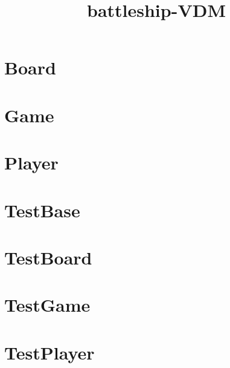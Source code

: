 \documentclass{article}
\begin{document}
\title{battleship-VDM}
\author{}
\maketitle
\tableofcontents

\section{Board}

\section{Game}

\section{Player}

\section{TestBase}

\section{TestBoard}

\section{TestGame}

\section{TestPlayer}

\end{document}
